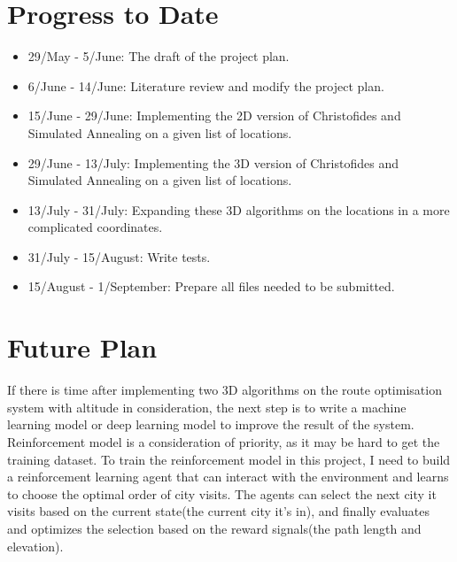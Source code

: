 \documentclass[project-plan]{report-template}
\begin{document}
\section {Progress to Date}
\begin{itemize}
    \item 29/May - 5/June: The draft of the project plan.
    \item 6/June - 14/June: Literature review and modify the project plan.
    \item 15/June - 29/June: Implementing the 2D version of Christofides and Simulated Annealing on a given list of locations.
    \item 29/June - 13/July: Implementing the 3D version of Christofides and Simulated Annealing on a given list of locations.
    \item 13/July - 31/July: Expanding these 3D algorithms on the locations in a more complicated coordinates.
    \item 31/July - 15/August: Write tests.
    \item 15/August - 1/September: Prepare all files needed to be submitted.
\end{itemize}

\section {Future Plan}
If there is time after implementing two 3D algorithms on the route optimisation system with altitude in
consideration, the next step is to write a machine learning model or deep learning model
to improve the result of the system. \\

Reinforcement model is a consideration of priority, as it may be hard to get the training dataset.
To train the reinforcement model in this project, I need to build a reinforcement learning agent that can
interact with the environment and learns to choose the optimal order of city visits. 
The agents can select the next city it visits based on the current state(the current city it's in), 
and finally evaluates and optimizes the selection based on the reward signals(the path length and elevation).



\end{document}

